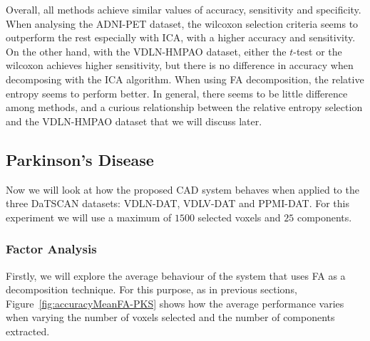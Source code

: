 Overall, all methods achieve similar values of accuracy, sensitivity and specificity. When analysing the ADNI-PET dataset, the wilcoxon selection criteria seems to outperform the rest especially with \ac{ICA}, with a higher accuracy and sensitivity. On the other hand, with the VDLN-HMPAO dataset, either the $t$-test or the wilcoxon achieves higher sensitivity, but there is no difference in accuracy when decomposing with the \ac{ICA} algorithm. When using \ac{FA} decomposition, the relative entropy seems to perform better. In general, there seems to be little difference among methods, and a curious relationship between the relative entropy selection and the VDLN-HMPAO dataset that we will discuss later. 

\FloatBarrier

\subsection{Parkinson's Disease}
Now we will look at how the proposed \ac{CAD} system behaves when applied to the three DaTSCAN datasets: VDLN-DAT, VDLV-DAT and PPMI-DAT. For this experiment we will use a maximum of $1500$ selected voxels and $25$ components. 

\subsubsection{Factor Analysis}
Firstly, we will explore the average behaviour of the system that uses \ac{FA} as a decomposition technique. For this purpose, as in previous sections, Figure~\ref{fig:accuracyMeanFA-PKS} shows how the average performance varies when varying the number of voxels selected and the number of components extracted. 

